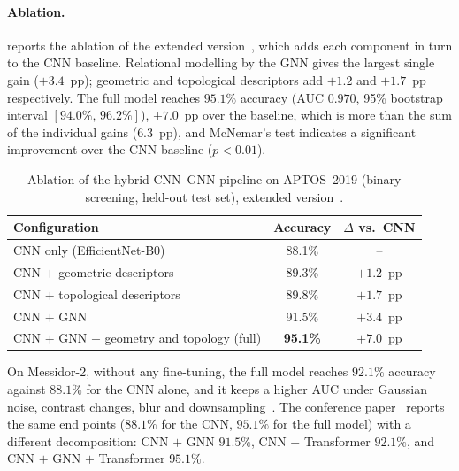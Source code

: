 \paragraph{Ablation.}
 reports the ablation of the extended version~\cite{mezghich2026lnaitopo},
which adds each component in turn to the CNN baseline. Relational modelling by the GNN
gives the largest single gain ($+3.4$~pp); geometric and topological descriptors add
$+1.2$ and $+1.7$~pp respectively. The full model reaches $95.1\%$ accuracy (AUC $0.970$,
95\% bootstrap interval $[94.0\%,\,96.2\%]$), $+7.0$~pp over the baseline, which is more
than the sum of the individual gains ($6.3$~pp), and McNemar's test indicates a
significant improvement over the CNN baseline ($p<0.01$).

\begin{table}[H]
\centering
\caption[Ablation of the hybrid CNN--GNN pipeline]{Ablation of the hybrid CNN--GNN pipeline
on APTOS~2019 (binary screening, held-out test set), extended
version~\cite{mezghich2026lnaitopo}.}
\label{tab:hybrid}
\small
\begin{tabular}{@{}lcc@{}}
\toprule
Configuration & Accuracy & $\Delta$ vs.\ CNN \\
\midrule
CNN only (EfficientNet-B0) & 88.1\% & -- \\
CNN $+$ geometric descriptors & 89.3\% & $+1.2$~pp \\
CNN $+$ topological descriptors & 89.8\% & $+1.7$~pp \\
CNN $+$ GNN & 91.5\% & $+3.4$~pp \\
CNN $+$ GNN $+$ geometry and topology (full) & \textbf{95.1\%} & $\mathbf{+7.0}$~pp \\
\bottomrule
\end{tabular}
\end{table}

On Messidor-2, without any fine-tuning, the full model reaches $92.1\%$ accuracy against
$88.1\%$ for the CNN alone, and it keeps a higher AUC under Gaussian noise, contrast
changes, blur and downsampling~\cite{mezghich2026lnaitopo}. The conference
paper~\cite{belhadj2026hybrid} reports the same end points ($88.1\%$ for the CNN, $95.1\%$
for the full model) with a different decomposition: CNN $+$ GNN $91.5\%$, CNN $+$
Transformer $92.1\%$, and CNN $+$ GNN $+$ Transformer $95.1\%$.

